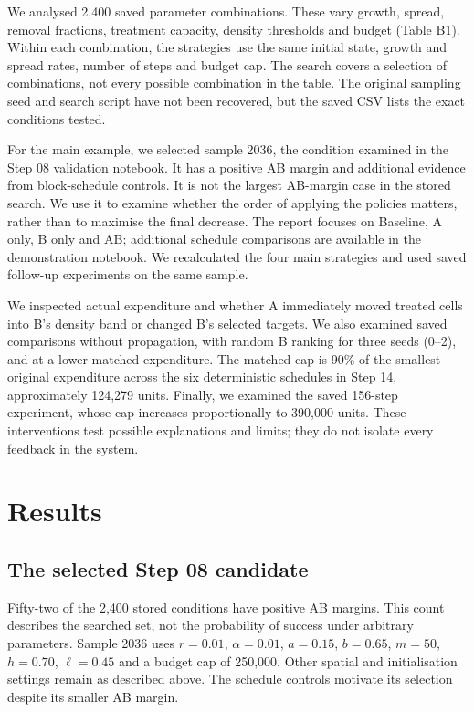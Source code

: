 \documentclass[a4paper,11pt]{article}
\begin{document}
We analysed 2,400 saved parameter combinations. These vary growth, spread, removal fractions, treatment capacity, density thresholds and budget (Table B1). Within each combination, the strategies use the same initial state, growth and spread rates, number of steps and budget cap. The search covers a selection of combinations, not every possible combination in the table. The original sampling seed and search script have not been recovered, but the saved CSV lists the exact conditions tested.

For the main example, we selected sample 2036, the condition examined in the Step 08 validation notebook. It has a positive AB margin and additional evidence from block-schedule controls. It is not the largest AB-margin case in the stored search. We use it to examine whether the order of applying the policies matters, rather than to maximise the final decrease. The report focuses on Baseline, A only, B only and AB; additional schedule comparisons are available in the demonstration notebook. We recalculated the four main strategies and used saved follow-up experiments on the same sample.

We inspected actual expenditure and whether A immediately moved treated cells into B's density band or changed B's selected targets. We also examined saved comparisons without propagation, with random B ranking for three seeds (0--2), and at a lower matched expenditure. The matched cap is 90\% of the smallest original expenditure across the six deterministic schedules in Step 14, approximately 124,279 units. Finally, we examined the saved 156-step experiment, whose cap increases proportionally to 390,000 units. These interventions test possible explanations and limits; they do not isolate every feedback in the system.

\section{Results}

\subsection{The selected Step 08 candidate}

Fifty-two of the 2,400 stored conditions have positive AB margins. This count describes the searched set, not the probability of success under arbitrary parameters. Sample 2036 uses $r=0.01$, $\alpha=0.01$, $a=0.15$, $b=0.65$, $m=50$, $h=0.70$, $\ell=0.45$ and a budget cap of 250,000. Other spatial and initialisation settings remain as described above. The schedule controls motivate its selection despite its smaller AB margin.
\end{document}
